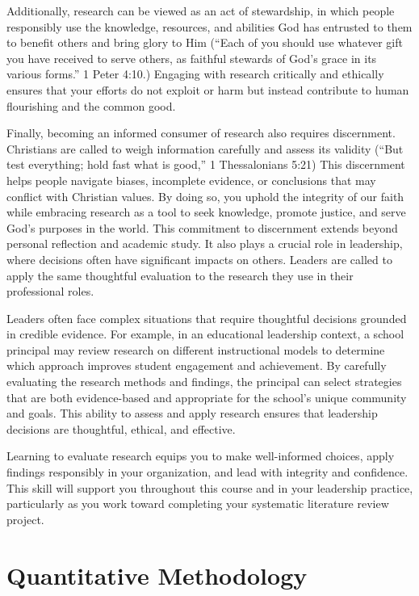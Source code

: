 \documentclass[
  letterpaper,
  DIV=11,
  numbers=noendperiod]{scrreprt}
\begin{document}
Additionally, research can be viewed as an act of stewardship, in which
people responsibly use the knowledge, resources, and abilities God has
entrusted to them to benefit others and bring glory to Him (``Each of
you should use whatever gift you have received to serve others, as
faithful stewards of God's grace in its various forms.'' 1 Peter 4:10.)
Engaging with research critically and ethically ensures that your
efforts do not exploit or harm but instead contribute to human
flourishing and the common good.

Finally, becoming an informed consumer of research also requires
discernment. Christians are called to weigh information carefully and
assess its validity (``But test everything; hold fast what is good,'' 1
Thessalonians 5:21) This discernment helps people navigate biases,
incomplete evidence, or conclusions that may conflict with Christian
values. By doing so, you uphold the integrity of our faith while
embracing research as a tool to seek knowledge, promote justice, and
serve God's purposes in the world. This commitment to discernment
extends beyond personal reflection and academic study. It also plays a
crucial role in leadership, where decisions often have significant
impacts on others. Leaders are called to apply the same thoughtful
evaluation to the research they use in their professional roles.

Leaders often face complex situations that require thoughtful decisions
grounded in credible evidence. For example, in an educational leadership
context, a school principal may review research on different
instructional models to determine which approach improves student
engagement and achievement. By carefully evaluating the research methods
and findings, the principal can select strategies that are both
evidence-based and appropriate for the school's unique community and
goals. This ability to assess and apply research ensures that leadership
decisions are thoughtful, ethical, and effective.

Learning to evaluate research equips you to make well-informed choices,
apply findings responsibly in your organization, and lead with integrity
and confidence. This skill will support you throughout this course and
in your leadership practice, particularly as you work toward completing
your systematic literature review project.


\chapter*{Quantitative Methodology}\label{quantitative-methodology}
\end{document}
